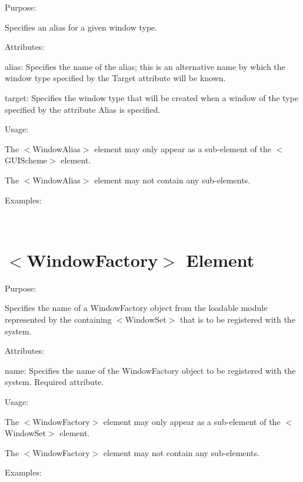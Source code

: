 \begin{DoxyItemize}
\item Purpose\+:
\begin{DoxyItemize}
\item Specifies an alias for a given window type.
\end{DoxyItemize}
\item Attributes\+:
\begin{DoxyItemize}
\item {\ttfamily alias\+:} Specifies the name of the alias; this is an alternative name by which the window type specified by the {\ttfamily Target} attribute will be known.
\item {\ttfamily target\+:} Specifies the window type that will be created when a window of the type specified by the attribute {\ttfamily Alias} is specified.
\end{DoxyItemize}
\item Usage\+:
\begin{DoxyItemize}
\item The $<$Window\+Alias$>$ element may only appear as a sub-\/element of the $<$G\+U\+I\+Scheme$>$ element.
\item The $<$Window\+Alias$>$ element may not contain any sub-\/elements.
\end{DoxyItemize}
\item Examples\+:
\end{DoxyItemize}

~\newline
 \hypertarget{xml_scheme_xml_scheme_windowfactory}{}\section{$<$\+Window\+Factory$>$ Element}\label{xml_scheme_xml_scheme_windowfactory}

\begin{DoxyItemize}
\item Purpose\+:
\begin{DoxyItemize}
\item Specifies the name of a Window\+Factory object from the loadable module represented by the containing $<$Window\+Set$>$ that is to be registered with the system.
\end{DoxyItemize}
\item Attributes\+:
\begin{DoxyItemize}
\item {\ttfamily name\+:} Specifies the name of the Window\+Factory object to be registered with the system. Required attribute.
\end{DoxyItemize}
\item Usage\+:
\begin{DoxyItemize}
\item The $<$Window\+Factory$>$ element may only appear as a sub-\/element of the $<$Window\+Set$>$ element.
\item The $<$Window\+Factory$>$ element may not contain any sub-\/elements.
\end{DoxyItemize}
\item Examples\+:
\end{DoxyItemize}

